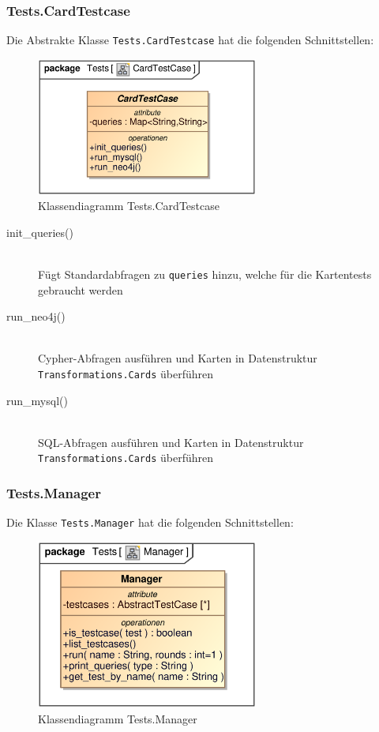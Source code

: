 \subsubsection{Tests.CardTestcase}
Die Abstrakte Klasse \verb|Tests.CardTestcase| hat die folgenden Schnittstellen:

\begin{figure}[H]
    \myfloatalign
    \includegraphics[width=0.65\textwidth]{gfx/MtGDeepAnalysis/CardTestcase.eps}
    \caption{Klassendiagramm Tests.CardTestcase}
    \label{fig:class:tests.CardTestcase}
\end{figure}

\begin{description}
    \item[init\_queries()] \hfill \\
    Fügt Standardabfragen zu \verb|queries| hinzu, welche für die Kartentests gebraucht werden
        
    \item[run\_neo4j()] \hfill \\
    Cypher-Abfragen ausführen und Karten in Datenstruktur \verb|Transformations.Cards| überführen
    
    \item[run\_mysql()] \hfill \\
    SQL-Abfragen ausführen und Karten in Datenstruktur \verb|Transformations.Cards| überführen
\end{description}

\subsubsection{Tests.Manager}
Die Klasse \verb|Tests.Manager| hat die folgenden Schnittstellen:

\begin{figure}[H]
    \myfloatalign
    \includegraphics[width=0.65\textwidth]{gfx/MtGDeepAnalysis/Manager.eps}
    \caption{Klassendiagramm Tests.Manager}
    \label{fig:class:tests.manager}
\end{figure}

